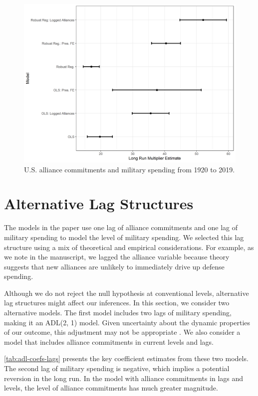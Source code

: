\documentclass[12pt]{article}
\begin{document}
\begin{figure} 
\includegraphics[width = .95\textwidth]{lrm-rob-pre45.png}
\caption{U.S. alliance commitments and military spending from 1920 to 2019.}
\label{fig:lrm-rob-pre45}
\end{figure}


\section{Alternative Lag Structures}

The models in the paper use one lag of alliance commitments and one lag of military spending to model the level of military spending. 
We selected this lag structure using a mix of theoretical and empirical considerations. 
For example, as we note in the manuscript, we lagged the alliance variable because theory suggests that new alliances are unlikely to immediately drive up defense spending. 


Although we do not reject the null hypothesis at conventional levels, alternative lag structures might affect our inferences. 
In this section, we consider two alternative models. 
The first model includes two lags of military spending, making it an ADL(2, 1) model.
Given uncertainty about the dynamic properties of our outcome, this adjustment may not be appropriate \citep{CookWebb2021}.
We also consider a model that includes alliance commitments in current levels and lags. 


\autoref{tab:adl-coefs-lags} presents the key coefficient estimates from these two models. 
The second lag of military spending is negative, which implies a potential reversion in the long run. 
In the model with alliance commitments in lags and levels, the level of alliance commitments has much greater magnitude. 
\end{document}
